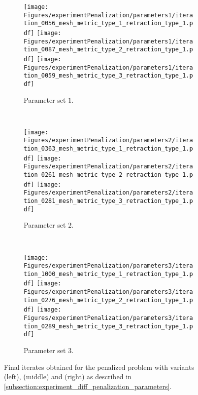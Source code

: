 \begin{figure}[htp]
	\begin{center}
		\begin{subfigure}{0.75\textwidth}
			\begin{center}
				\texttt{[image: Figures/experimentPenalization/parameters1/iteration\_0056\_mesh\_metric\_type\_1\_retraction\_type\_1.pdf]}
				\quad
				\texttt{[image: Figures/experimentPenalization/parameters1/iteration\_0087\_mesh\_metric\_type\_2\_retraction\_type\_1.pdf]}
				\quad
				\texttt{[image: Figures/experimentPenalization/parameters1/iteration\_0059\_mesh\_metric\_type\_3\_retraction\_type\_1.pdf]}
				\caption{Parameter set $1$.}
			\end{center}
		\end{subfigure}
		\\
		\begin{subfigure}{0.75\textwidth}
			\begin{center}
				\texttt{[image: Figures/experimentPenalization/parameters2/iteration\_0363\_mesh\_metric\_type\_1\_retraction\_type\_1.pdf]}
				\quad
				\texttt{[image: Figures/experimentPenalization/parameters2/iteration\_0261\_mesh\_metric\_type\_2\_retraction\_type\_1.pdf]}
				\quad
				\texttt{[image: Figures/experimentPenalization/parameters2/iteration\_0281\_mesh\_metric\_type\_3\_retraction\_type\_1.pdf]}
				\caption{Parameter set $2$.}
			\end{center}
		\end{subfigure}
		\\
		\begin{subfigure}{0.75\textwidth}
			\begin{center}
				\texttt{[image: Figures/experimentPenalization/parameters3/iteration\_1000\_mesh\_metric\_type\_1\_retraction\_type\_1.pdf]}
				\quad
				\texttt{[image: Figures/experimentPenalization/parameters3/iteration\_0276\_mesh\_metric\_type\_2\_retraction\_type\_1.pdf]}
				\quad
				\texttt{[image: Figures/experimentPenalization/parameters3/iteration\_0289\_mesh\_metric\_type\_3\_retraction\_type\_1.pdf]}
				\caption{Parameter set $3$.}
			\end{center}
		\end{subfigure}
	\end{center}
	\caption{Final iterates obtained for the penalized problem with variants \EucEuc (left), \ElasEuc (middle) and \CompEuc (right) as described in \cref{subsection:experiment_diff_penalization_parameters}.}
	\label{fig:experiment_diff_penalization_parameters}
\end{figure}
